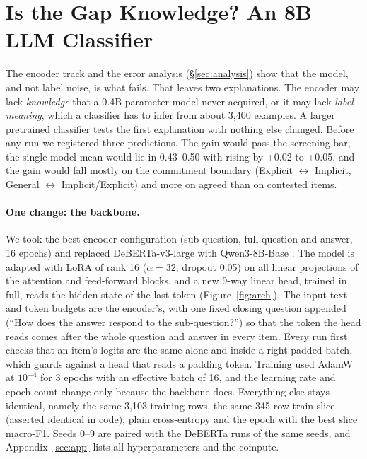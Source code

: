 \section{Is the Gap Knowledge? An 8B LLM Classifier}\label{sec:llm}

The encoder track and the error analysis (\S\ref{sec:analysis}) show that the model, and not label noise, is what fails.
That leaves two explanations.
The encoder may lack \emph{knowledge} that a 0.4B-parameter model never acquired, or it may lack \emph{label meaning}, which a classifier has to infer from about 3,400 examples.
A larger pretrained classifier tests the first explanation with nothing else changed.
Before any run we registered three predictions.
The gain would pass the screening bar, the single-model \Stwo{} mean would lie in 0.43--0.50 with \Sone{} rising by +0.02 to +0.05, and the gain would fall mostly on the commitment boundary (Explicit $\leftrightarrow$ Implicit, General $\leftrightarrow$ Implicit/Explicit) and more on agreed than on contested items.

\paragraph{One change: the backbone.}
We took the best encoder configuration (sub-question, full question and answer, 16 epochs) and replaced DeBERTa-v3-large with Qwen3-8B-Base \citep{qwen3}.
The model is adapted with LoRA \citep{hu2022lora} of rank 16 ($\alpha=32$, dropout 0.05) on all linear projections of the attention and feed-forward blocks, and a new 9-way linear head, trained in full, reads the hidden state of the last token (Figure~\ref{fig:arch}).
The input text and token budgets are the encoder's, with one fixed closing question appended (``How does the answer respond to the sub-question?'') so that the token the head reads comes after the whole question and answer in every item.
Every run first checks that an item's logits are the same alone and inside a right-padded batch, which guards against a head that reads a padding token.
Training used AdamW at $10^{-4}$ for 3 epochs with an effective batch of 16, and the learning rate and epoch count change only because the backbone does.
Everything else stays identical, namely the same 3,103 training rows, the same 345-row train slice (asserted identical in code), plain cross-entropy and the epoch with the best slice macro-F1.
Seeds 0--9 are paired with the DeBERTa runs of the same seeds, and Appendix~\ref{sec:app} lists all hyperparameters and the compute.

